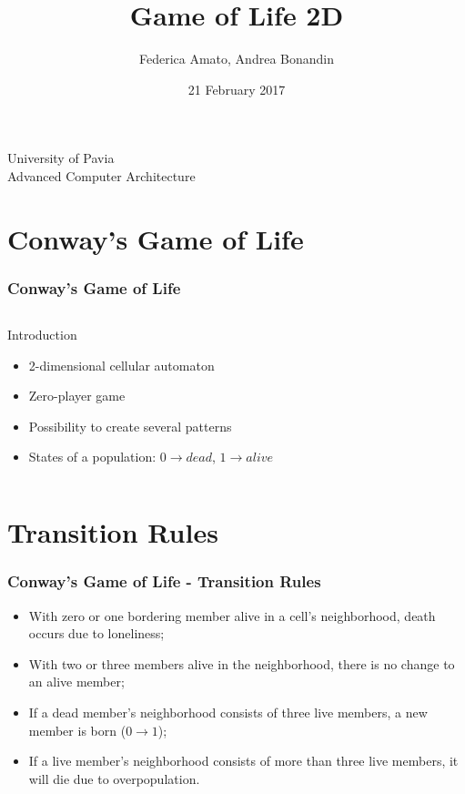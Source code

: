 \documentclass{beamer}
\begin{document}
\title{Game of Life 2D}
\author{Federica Amato, Andrea Bonandin}
\date{21 February 2017}

\begin{frame}
	\begin{center}
		\Large{University of Pavia \\
		Advanced Computer Architecture}
	\end{center}
	\titlepage
\end{frame}

\section{Conway's Game of Life}
\begin{frame}
	\frametitle{Conway's Game of Life}

	\begin{columns}
		\begin{block}{Introduction}
			\begin{itemize}
				\item 2-dimensional cellular automaton
				\item Zero-player game
				\item Possibility to create several patterns
				\item States of a population: $0 \rightarrow dead$, $1 \rightarrow alive$
			\end{itemize}
		\end{block}
	\end{columns}
\end{frame}

\section{Transition Rules}
\begin{frame}
	\frametitle{Conway's Game of Life - Transition Rules}
	\begin{itemize}
		\item With zero or one bordering member alive in a cell's neighborhood, death occurs due to loneliness;
		\item With two or three members alive in the neighborhood, there is no change to an alive member;
		\item If a dead member's neighborhood consists of three live members, a new member is born ($0 \rightarrow 1$);
		\item If a live member's neighborhood consists of more than three live members, it will die due to overpopulation.
	\end{itemize}
\end{frame}
\end{document}
